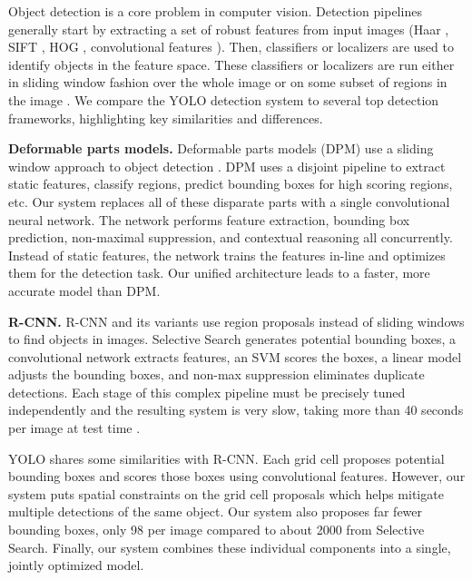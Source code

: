 Object detection is a core problem in computer vision. Detection pipelines generally start by extracting a set of robust features from input images (Haar \cite{papageorgiou1998general}, SIFT \cite{lowe1999object}, HOG \cite{dalal2005histograms}, convolutional features \cite{donahue2013decaf}). Then, classifiers \cite{viola2001robust,lienhart2002extended,girshick2014rich,lsvm-pami} or localizers \cite{blaschko2008learning,DBLP:journals/corr/SermanetEZMFL13} are used to identify objects in the feature space. These classifiers or localizers are run either in sliding window fashion over the whole image or on some subset of regions in the image \cite{uijlings2013selective,gould2009region,zitnick2014edge}. We compare the YOLO detection system to several top detection frameworks, highlighting key similarities and differences.

\textbf{Deformable parts models.} Deformable parts models (DPM) use a sliding window approach to object detection \cite{lsvm-pami}. DPM uses a disjoint pipeline to extract static features, classify regions, predict bounding boxes for high scoring regions, etc. Our system replaces all of these disparate parts with a single convolutional neural network. The network performs feature extraction, bounding box prediction, non-maximal suppression, and contextual reasoning all concurrently. Instead of static features, the network trains the features in-line and optimizes them for the detection task. Our unified architecture leads to a faster, more accurate model than DPM.

\textbf{R-CNN.} R-CNN and its variants use region proposals instead of sliding windows to find objects in images. Selective Search \cite{uijlings2013selective} generates potential bounding boxes, a convolutional network extracts features, an SVM scores the boxes, a linear model adjusts the bounding boxes, and non-max suppression eliminates duplicate detections. Each stage of this complex pipeline must be precisely tuned independently and the resulting system is very slow, taking more than 40 seconds per image at test time \cite{DBLP:journals/corr/Girshick15}.

YOLO shares some similarities with R-CNN. Each grid cell proposes potential bounding boxes and scores those boxes using convolutional features. However, our system puts spatial constraints on the grid cell proposals which helps mitigate multiple detections of the same object. Our system also proposes far fewer bounding boxes, only 98 per image compared to about 2000 from Selective Search. Finally, our system combines these individual components into a single, jointly optimized model.

